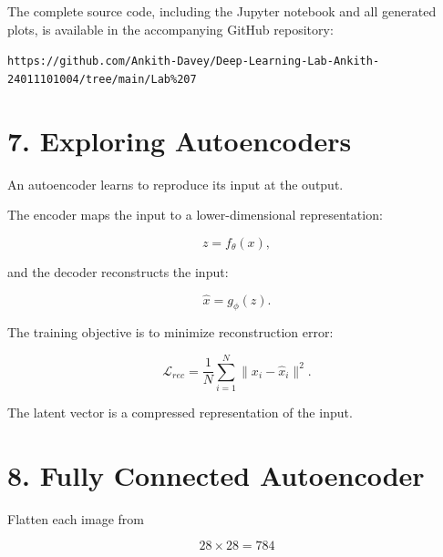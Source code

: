 \documentclass[10pt]{article}
\begin{document}
The complete source code, including the Jupyter notebook and all generated plots, is available in the accompanying GitHub repository:

\vspace{4pt}
\noindent\texttt{https://github.com/Ankith-Davey/Deep-Learning-Lab-Ankith-24011101004/tree/main/Lab\%207}    
\vspace{4pt}

\section*{7. Exploring Autoencoders}

An autoencoder learns to reproduce its input at the output.

The encoder maps the input to a lower-dimensional representation:

\[
z=f_{\theta}(x),
\]

and the decoder reconstructs the input:

\[
\hat{x}=g_{\phi}(z).
\]

The training objective is to minimize reconstruction error:

\[
\mathcal{L}_{rec}
=
\frac{1}{N}\sum_{i=1}^{N}
\|x_i-\hat{x}_i\|^2.
\]

\begin{center}
\end{center}

The latent vector is a compressed representation of the input.

\section*{8. Fully Connected Autoencoder}

Flatten each image from

\[
28\times28=784
\]
\end{document}

